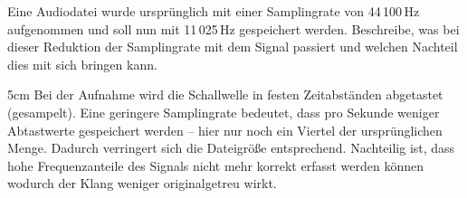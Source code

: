 
\question[3]
Eine Audiodatei wurde ursprünglich mit einer Samplingrate von 44\,100\,Hz aufgenommen
und soll nun mit 11\,025\,Hz gespeichert werden. Beschreibe, was bei dieser Reduktion 
der Samplingrate mit dem Signal passiert und welchen Nachteil dies mit sich bringen kann.

\begin{solutionbox}{5cm}
Bei der Aufnahme wird die Schallwelle in festen Zeitabständen abgetastet (gesampelt). 
Eine geringere Samplingrate bedeutet, dass pro Sekunde weniger Abtastwerte gespeichert werden
 -- hier nur noch ein Viertel der ursprünglichen Menge. 
Dadurch verringert sich die Dateigröße entsprechend.
Nachteilig ist, dass hohe Frequenzanteile des Signals nicht mehr korrekt erfasst werden
können wodurch der Klang weniger originalgetreu wirkt. 
\end{solutionbox}